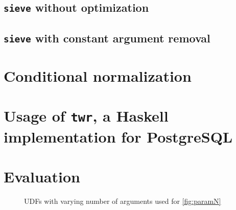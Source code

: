 \subsection{\texttt{sieve} without optimization}
\subsection{\texttt{sieve} with constant argument removal}
\section{Conditional normalization}
\section{Usage of \texttt{twr}, a Haskell implementation for PostgreSQL}
\label{sql:cond_norm}
\section{Evaluation}
\begin{figure}
    \centering
    \caption{UDFs with varying number of arguments used for \autoref{fig:paramN}}
    \label{udfs:paramN}
\end{figure}
